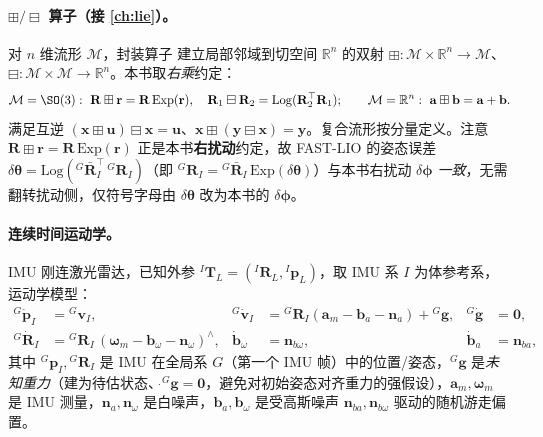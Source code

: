 \paragraph{$\boxplus/\boxminus$ 算子（接 \cref{ch:lie}）。}
对 $n$ 维流形 $\mathcal{M}$，封装算子\cite{hertzberg2013integrating} 建立局部邻域到切空间 $\mathbb{R}^n$ 的双射 $\boxplus:\mathcal{M}\times\mathbb{R}^n\to\mathcal{M}$、$\boxminus:\mathcal{M}\times\mathcal{M}\to\mathbb{R}^n$。本书取\emph{右乘}约定：
\begin{equation}
  \mathcal{M}=\SO(3):\ \mathbf{R}\boxplus\mathbf{r}=\mathbf{R}\,\mathrm{Exp}(\mathbf{r}),\quad \mathbf{R}_1\boxminus\mathbf{R}_2=\mathrm{Log}(\mathbf{R}_2^\top\mathbf{R}_1);\qquad \mathcal{M}=\mathbb{R}^n:\ \mathbf{a}\boxplus\mathbf{b}=\mathbf{a}+\mathbf{b}.
  \label{eq:lidar-fl-boxplus}
\end{equation}
满足互逆 $(\mathbf{x}\boxplus\mathbf{u})\boxminus\mathbf{x}=\mathbf{u}$、$\mathbf{x}\boxplus(\mathbf{y}\boxminus\mathbf{x})=\mathbf{y}$。复合流形按分量定义。注意 $\mathbf{R}\boxplus\mathbf{r}=\mathbf{R}\,\mathrm{Exp}(\mathbf{r})$ 正是本书\textbf{右扰动}约定，故 FAST-LIO 的姿态误差 $\delta\boldsymbol{\theta}=\mathrm{Log}({}^G\bar{\mathbf{R}}_I^\top\,{}^G\mathbf{R}_I)$（即 ${}^G\mathbf{R}_I={}^G\bar{\mathbf{R}}_I\,\mathrm{Exp}(\delta\boldsymbol{\theta})$）与本书右扰动 $\delta\boldsymbol{\phi}$ \emph{一致}，无需翻转扰动侧，仅符号字母由 $\delta\boldsymbol{\theta}$ 改为本书的 $\delta\boldsymbol{\phi}$。

\paragraph{连续时间运动学。}
IMU 刚连激光雷达，已知外参 ${}^I\mathbf{T}_L=({}^I\mathbf{R}_L,{}^I\mathbf{p}_L)$，取 IMU 系 $I$ 为体参考系，运动学模型\cite{xu2021fastlio}：
\begin{equation}
\begin{aligned}
{}^G\dot{\mathbf{p}}_I&={}^G\mathbf{v}_I, &
{}^G\dot{\mathbf{v}}_I&={}^G\mathbf{R}_I(\mathbf{a}_m-\mathbf{b}_a-\mathbf{n}_a)+{}^G\mathbf{g}, &
{}^G\dot{\mathbf{g}}&=\mathbf{0},\\
{}^G\dot{\mathbf{R}}_I&={}^G\mathbf{R}_I\,(\boldsymbol{\omega}_m-\mathbf{b}_\omega-\mathbf{n}_\omega)^\wedge, &
\dot{\mathbf{b}}_\omega&=\mathbf{n}_{b\omega}, &
\dot{\mathbf{b}}_a&=\mathbf{n}_{ba},
\end{aligned}
\label{eq:lidar-fl-cont}
\end{equation}
其中 ${}^G\mathbf{p}_I,{}^G\mathbf{R}_I$ 是 IMU 在全局系 $G$（第一个 IMU 帧）中的位置/姿态，${}^G\mathbf{g}$ 是\emph{未知重力}（建为待估状态、$\dot{}^G\mathbf{g}=\mathbf{0}$，避免对初始姿态对齐重力的强假设），$\mathbf{a}_m,\boldsymbol{\omega}_m$ 是 IMU 测量，$\mathbf{n}_a,\mathbf{n}_\omega$ 是白噪声，$\mathbf{b}_a,\mathbf{b}_\omega$ 是受高斯噪声 $\mathbf{n}_{ba},\mathbf{n}_{b\omega}$ 驱动的随机游走偏置。

